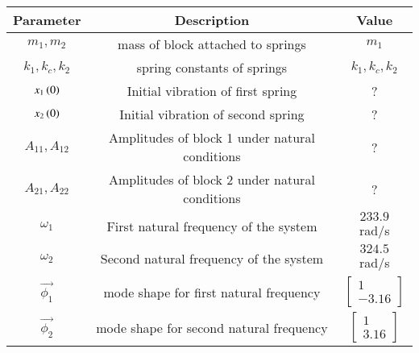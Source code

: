\begin{tabular}{|c|c|c|}
    \hline
    \textbf{Parameter} & \textbf{Description} & \textbf{Value} \\
    \hline
    $m_1,m_2$ & mass of block attached to springs& $ m_1$\\
    \hline
    $k_1,k_c,k_2$ & spring constants of springs& $ k_1,k_c,k_2$\\
    \hline
    $x_1\left(0\right)$ & Initial vibration of first spring& ? \\
    \hline
    $x_2\left(0\right)$ & Initial vibration of second spring & ? \\
    \hline
    $A_{11},A_{12}$ & Amplitudes of block 1 under natural conditions& ?\\
    \hline
    $A_{21},A_{22}$ & Amplitudes of block 2 under natural conditions& ?\\
    \hline
    $\omega_1$ & First natural frequency of the system& $ 233.9$ rad/s\\
    \hline
    $\omega_2$ & Second natural frequency of the system &$ 324.5$ rad/s \\
    \hline
    $\vec{\phi_1}$ & mode shape for first natural frequency& $ \begin{bmatrix}
1\\
-3.16
\end{bmatrix}$\\
    \hline
    $\vec{\phi_2}$ & mode shape for second natural frequency& $ \begin{bmatrix}
1\\
3.16
\end{bmatrix}$\\
    \hline
\end{tabular}





